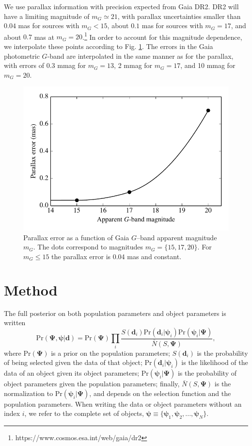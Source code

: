 \documentclass[fleqn,usenatbib]{mnras}
\newcommand{\popp}{\boldsymbol{\Psi}}
\newcommand{\objp}{\boldsymbol{\psi}}
\newcommand{\data}{\mathbf{d}}
\newcommand{\pr}{\text{Pr}}
\begin{document}
We use parallax information with precision expected from Gaia DR2. DR2 will have a limiting magnitude of $m_G \simeq 21$, with parallax uncertainties smaller than $0.04$ mas for sources with $m_G<15$, about $0.1$ mas for sources with $m_G=17$, and about $0.7$ mas at $m_G=20$.\footnote{https://www.cosmos.esa.int/web/gaia/dr2} In order to account for this magnitude dependence, we interpolate these points according to Fig. \ref{fig:parallax_error}. The errors in the Gaia photometric $G$-band are interpolated in the same manner as for the parallax, with errors of 0.3 mmag for $m_G = 13$, 2 mmag for $m_G = 17$, and 10 mmag for $m_G = 20$.

\begin{figure}
	\includegraphics[width=\columnwidth]{parallax_error.pdf}
    \caption{Parallax error as a function of Gaia $G$--band apparent magnitude $m_G$. The dots correspond to magnitudes $m_G=\{15,17,20\}$. For $m_G\leq 15$ the parallax error is 0.04 mas and constant.}
    \label{fig:parallax_error}
\end{figure}





\section{Method}\label{sec:method}

The full posterior on both population parameters and object parameters is written
\begin{equation}\label{eq:fullposterior}
	\pr(\popp,\objp | \data ) = \pr(\popp)
    \prod_i \frac{S(\data_i) \pr(\data_i|\objp_i) \pr(\objp_i | \popp)}{\bar{N}(S,\popp)},
\end{equation}
where $\pr(\popp)$ is a prior on the population parameters; $S(\data_i)$ is the probability of being selected given the data of that object; $\pr(\data_i|\objp_i)$ is the likelihood of the data of an object given its object parameters; $\pr(\objp_i | \popp)$ is the probability of object parameters given the population parameters; finally, $\bar{N}(S,\popp)$ is the normalization to $\pr(\objp_i | \popp)$, and depends on the selection function and the population parameters. When writing the data or object parameters without an index $i$, we refer to the complete set of objects, $\objp \equiv \{ \objp_1,\objp_2,...,\objp_N \}$.
\end{document}
